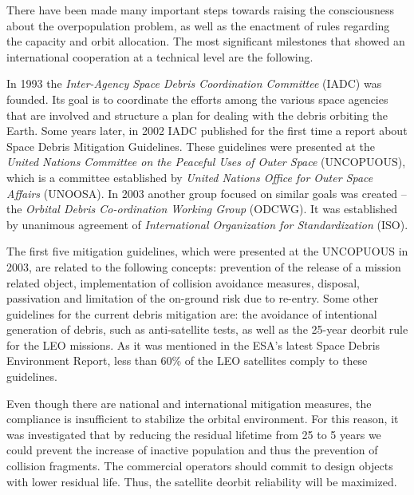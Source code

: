 \bigskip
There have been made many important steps towards raising the consciousness about the overpopulation problem, as well as the enactment of rules regarding the capacity and orbit allocation. The most significant milestones that showed an international cooperation at a technical level are the following.

In 1993 the \textit{Inter-Agency Space Debris Coordination Committee} (IADC) was founded. Its goal is to coordinate the efforts among the various space agencies that are involved and structure a plan for dealing with the debris orbiting the Earth. Some years later, in 2002 IADC published for the first time a report about Space Debris Mitigation Guidelines. \cite{UNOOSA} %
These guidelines were presented at the \textit{United Nations Committee on the Peaceful Uses of Outer Space} (UNCOPUOUS), which is a committee established by \textit{United Nations Office for Outer Space Affairs} (UNOOSA). \cite{IADC 2007} In 2003 another group focused on similar goals was created – the \textit{Orbital Debris Co-ordination Working Group} (ODCWG). It was established by unanimous agreement of \textit{International Organization for Standardization} (ISO). \cite{Klinkrad 2006}

The first five mitigation guidelines, which were presented at the UNCOPUOUS in 2003, are related to the following concepts: prevention of the release of a mission related object, implementation of collision avoidance measures, disposal, passivation and limitation of the on-ground risk due to re-entry. Some other guidelines for the current debris mitigation are: the avoidance of intentional generation of debris, such as anti-satellite tests, as well as the 25-year deorbit rule for the LEO missions. As it was mentioned in the ESA's latest Space Debris Environment Report, less than 60\% of the LEO satellites comply to these guidelines. \cite{ESA 2019} %

Even though there are national and international mitigation measures, the compliance is insufficient to stabilize the orbital environment. For this reason, it was investigated that by reducing the residual lifetime from 25 to 5 years we could prevent the increase of inactive population and thus the prevention of collision fragments. The commercial operators should commit to design objects with lower residual life. Thus, the satellite deorbit reliability will be maximized. \cite{Somma 2019}

